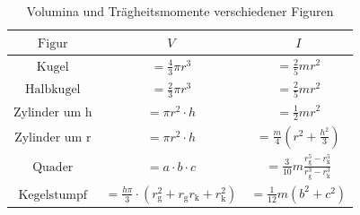   \begin{table}
    \centering
    \caption{Volumina und Trägheitsmomente verschiedener Figuren}
    \label{tab:Formeln}
    \begin{tabular}{c c c}
    \toprule
    $\text{Figur}$ & $V$ & $I$ \\
    \midrule
     $\text{Kugel}$         & $ = \frac{4}{3} \pi r^3 $ & $ = \frac{2}{5} m r^2 $ \\                        
     $\text{Halbkugel}$     & $ = \frac{2}{3} \pi r^3 $ & $ = \frac{2}{5} m r^2 $ \\
     $\text{Zylinder um h}$ & $ = \pi r^2 \cdot h $     & $ = \frac{1}{2} m r^2 $ \\
     $\text{Zylinder um r}$ & $ = \pi r^2 \cdot h $     & $ = \frac{m}{4} \left(r^2 + \frac{h^2}{3} \right)$ \\
     $\text{Quader}$        & $ = a\cdot b \cdot c$     & $ = \frac{3}{10} m \frac{r_\text{g}^5 - r_\text{k}^5}{r_\text{g}^3 - r_\text{k}^3}$ \\
     $\text{Kegelstumpf}$   & $ = \frac{h \pi}{3}\cdot \left(r_\text{g}^2 + r_\text{g} r_\text{k}
      + r_\text{k}^2 \right) $ & $ = \frac{1}{12} m \left(b^2 + c^2 \right)$ \\
    \bottomrule
    \end{tabular}
    \end{table}

